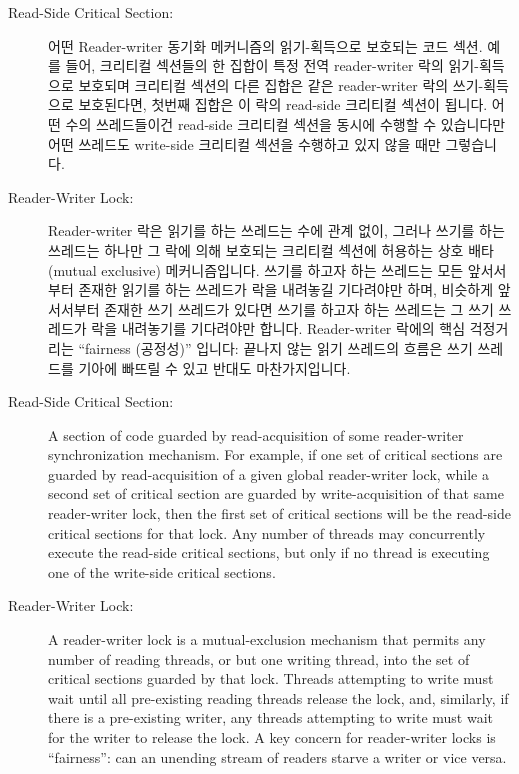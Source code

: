 \begin{description}
\item[Read-Side Critical Section:]
	어떤 Reader-writer 동기화 메커니즘의 읽기-획득으로 보호되는 코드 섹션.
	예를 들어, 크리티컬 섹션들의 한 집합이 특정 전역 reader-writer 락의
	읽기-획득으로 보호되며 크리티컬 섹션의 다른 집합은 같은 reader-writer
	락의 쓰기-획득으로 보호된다면, 첫번째 집합은 이 락의 read-side 크리티컬
	섹션이 됩니다.
	어떤 수의 쓰레드들이건 read-side 크리티컬 섹션을 동시에 수행할 수
	있습니다만 어떤 쓰레드도 write-side 크리티컬 섹션을 수행하고 있지 않을
	때만 그렇습니다.
\item[Reader-Writer Lock:]
	Reader-writer 락은 읽기를 하는 쓰레드는 수에 관계 없이, 그러나 쓰기를
	하는 쓰레드는 하나만 그 락에 의해 보호되는 크리티컬 섹션에 허용하는
	상호 배타 (mutual exclusive) 메커니즘입니다.
	쓰기를 하고자 하는 쓰레드는 모든 앞서서부터 존재한 읽기를 하는 쓰레드가
	락을 내려놓길 기다려야만 하며, 비슷하게 앞서서부터 존재한 쓰기 쓰레드가
	있다면 쓰기를 하고자 하는 쓰레드는 그 쓰기 쓰레드가 락을 내려놓기를
	기다려야만 합니다.
	Reader-writer 락에의 핵심 걱정거리는 ``fairness (공정성)'' 입니다:
	끝나지 않는 읽기 쓰레드의 흐름은 쓰기 쓰레드를 기아에 빠뜨릴 수 있고
	반대도 마찬가지입니다.

\iffalse

\item[Read-Side Critical Section:]
	A section of code guarded by read-acquisition of
	some reader-writer synchronization mechanism.
	For example, if one set of critical sections are guarded by
	read-acquisition of
	a given global reader-writer lock, while a second set of critical
	section are guarded by write-acquisition of that same reader-writer
	lock, then the first set of critical sections will be the
	read-side critical sections for that lock.
	Any number of threads may concurrently execute the read-side
	critical sections, but only if no thread is executing one of
	the write-side critical sections.
\item[Reader-Writer Lock:]
	A reader-writer lock is a mutual-exclusion mechanism that
	permits any number of reading
	threads, or but one writing thread, into the set of critical
	sections guarded by that lock.
	Threads attempting to write must wait until all pre-existing
	reading threads release the lock, and, similarly, if there
	is a pre-existing writer, any threads attempting to write must
	wait for the writer to release the lock.
	A key concern for reader-writer locks is ``fairness'':
	can an unending stream of readers starve a writer or vice versa.


\end{description}
